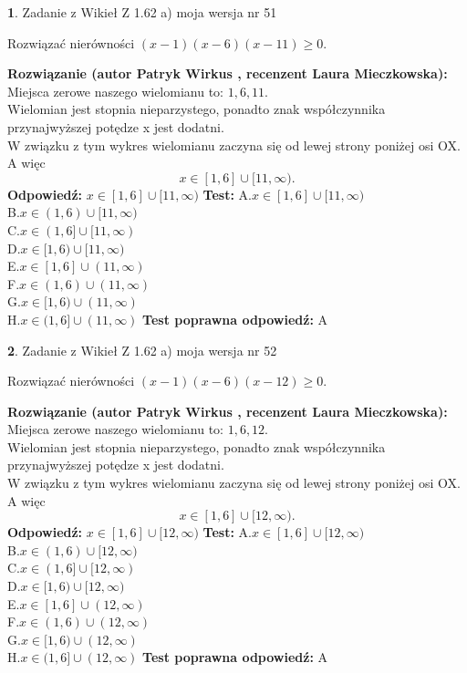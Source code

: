 \documentclass[12pt, a4paper]{article}
\theoremstyle{definition} %
\newtheorem{zad}{}
\newcommand{\zadStart}[1]{\begin{zad}#1\newline}
\newcommand{\zadStop}{\end{zad}}
\newcommand{\rozwStart}[2]{\noindent \textbf{Rozwiązanie (autor #1 , recenzent #2): }\newline}
\newcommand{\rozwStop}{\newline}
\newcommand{\odpStart}{\noindent \textbf{Odpowiedź:}\newline}
\newcommand{\odpStop}{\newline}
\newcommand{\testStart}{\noindent \textbf{Test:}\newline}
\newcommand{\testStop}{\newline}
\newcommand{\kluczStart}{\noindent \textbf{Test poprawna odpowiedź:}\newline}
\newcommand{\kluczStop}{\newline}
\begin{document}
\zadStart{Zadanie z Wikieł Z 1.62 a) moja wersja nr 51}

Rozwiązać nierówności $(x-1)(x-6)(x-11)\ge0$.
\zadStop
\rozwStart{Patryk Wirkus}{Laura Mieczkowska}
Miejsca zerowe naszego wielomianu to: $1, 6, 11$.\\
Wielomian jest stopnia nieparzystego, ponadto znak współczynnika przy\linebreak najwyższej potędze x jest dodatni.\\ W związku z tym wykres wielomianu zaczyna się od lewej strony poniżej osi OX. A więc $$x \in [1,6] \cup [11,\infty).$$
\rozwStop
\odpStart
$x \in [1,6] \cup [11,\infty)$
\odpStop
\testStart
A.$x \in [1,6] \cup [11,\infty)$\\
B.$x \in (1,6) \cup [11,\infty)$\\
C.$x \in (1,6] \cup [11,\infty)$\\
D.$x \in [1,6) \cup [11,\infty)$\\
E.$x \in [1,6] \cup (11,\infty)$\\
F.$x \in (1,6) \cup (11,\infty)$\\
G.$x \in [1,6) \cup (11,\infty)$\\
H.$x \in (1,6] \cup (11,\infty)$
\testStop
\kluczStart
A
\kluczStop



\zadStart{Zadanie z Wikieł Z 1.62 a) moja wersja nr 52}

Rozwiązać nierówności $(x-1)(x-6)(x-12)\ge0$.
\zadStop
\rozwStart{Patryk Wirkus}{Laura Mieczkowska}
Miejsca zerowe naszego wielomianu to: $1, 6, 12$.\\
Wielomian jest stopnia nieparzystego, ponadto znak współczynnika przy\linebreak najwyższej potędze x jest dodatni.\\ W związku z tym wykres wielomianu zaczyna się od lewej strony poniżej osi OX. A więc $$x \in [1,6] \cup [12,\infty).$$
\rozwStop
\odpStart
$x \in [1,6] \cup [12,\infty)$
\odpStop
\testStart
A.$x \in [1,6] \cup [12,\infty)$\\
B.$x \in (1,6) \cup [12,\infty)$\\
C.$x \in (1,6] \cup [12,\infty)$\\
D.$x \in [1,6) \cup [12,\infty)$\\
E.$x \in [1,6] \cup (12,\infty)$\\
F.$x \in (1,6) \cup (12,\infty)$\\
G.$x \in [1,6) \cup (12,\infty)$\\
H.$x \in (1,6] \cup (12,\infty)$
\testStop
\kluczStart
A
\kluczStop
\end{document}
